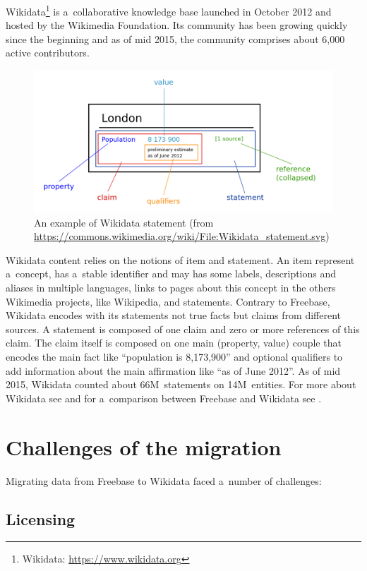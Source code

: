 \documentclass{sig-alternate}
\begin{document}
Wikidata\footnote{Wikidata: \url{https://www.wikidata.org}}
is a~collaborative knowledge base
launched in October 2012 and hosted by the Wikimedia Foundation.
Its community has been growing quickly since the beginning and as of mid 2015,
the community comprises about 6,000 active contributors.

\begin{figure}
\centering
\includegraphics[width=8.45 cm]{img/Wikidata-statement.png}
\caption{An example of Wikidata statement (from
\url{https://commons.wikimedia.org/wiki/File:Wikidata_statement.svg})}
\label{fig-statement}
\end{figure}

Wikidata content relies on the notions of item and statement.
An item represent a~concept, has a~stable identifier and may has some labels,
descriptions and aliases in multiple languages, links to pages about this concept
in the others Wikimedia projects, like Wikipedia, and statements.
Contrary to Freebase, Wikidata encodes with its statements not true facts
but claims from different sources.
A statement is composed of one claim and zero or more references of this claim.
The claim itself is composed on one main (property, value) couple that encodes
the main fact like ``population is 8,173,900'' and optional qualifiers
to add information about the main affirmation like ``as of June 2012''.
As of mid 2015, Wikidata counted about 66M~statements on 14M~entities.
For more about Wikidata see \cite{vrandevcic2014wikidata}
and for a~comparison between Freebase and Wikidata see \cite{farbercomparative}.

\section{Challenges of the migration}

Migrating data from Freebase to Wikidata faced a~number of challenges:

\subsection{Licensing}
\label{sec-licensing}
\end{document}
